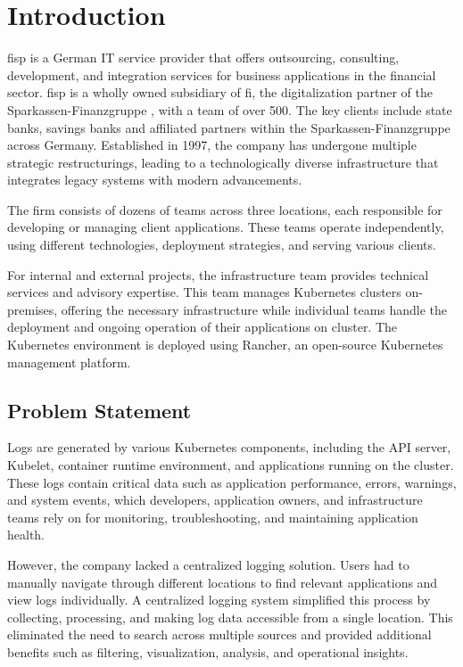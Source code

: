 \documentclass[../main.tex]{subfiles}
\begin{document}
\chapter{Introduction}

\gls{fisp} \cite{fisp} is a German IT service provider that offers outsourcing, consulting, development, and integration services for business applications in the financial sector. \gls{fisp} is a wholly owned subsidiary of \gls{fi}, the digitalization partner of the Sparkassen-Finanzgruppe \cite{spfi}, with a team of over 500.  The key clients include state banks, savings banks and affiliated partners within the Sparkassen-Finanzgruppe across Germany. Established in 1997, the company has undergone multiple strategic restructurings, leading to a technologically diverse infrastructure that integrates legacy systems with modern advancements.

The firm consists of dozens of teams across three locations, each responsible for developing or managing client applications. These teams operate independently, using different technologies, deployment strategies, and serving various clients.

For internal and external projects, the infrastructure team provides technical services and advisory expertise. This team manages Kubernetes clusters on-premises, offering the necessary infrastructure while individual teams handle the deployment and ongoing operation of their applications on cluster. The Kubernetes environment is deployed using Rancher, an open-source Kubernetes management platform.

\section{Problem Statement}

Logs are generated by various Kubernetes components, including the API server, Kubelet, container runtime environment, and applications running on the cluster. These logs contain critical data such as application performance, errors, warnings, and system events, which developers, application owners, and infrastructure teams rely on for monitoring, troubleshooting, and maintaining application health.

However, the company lacked a centralized logging solution. Users had to manually navigate through different locations to find relevant applications and view logs individually. A centralized logging system simplified this process by collecting, processing, and making log data accessible from a single location. This eliminated the need to search across multiple sources and provided additional benefits such as filtering, visualization, analysis, and operational insights.
\end{document}
